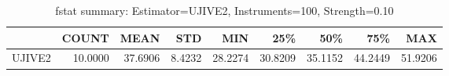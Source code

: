 \begin{table}[ht]
\centering
\caption{fstat summary: Estimator=UJIVE2, Instruments=100, Strength=0.10}
\begin{tabular}{lrrrrrrrr}
\toprule
 & COUNT & MEAN & STD & MIN & 25\% & 50\% & 75\% & MAX \\
\midrule
UJIVE2 & 10.0000 & 37.6906 & 8.4232 & 28.2274 & 30.8209 & 35.1152 & 44.2449 & 51.9206 \\
\bottomrule
\end{tabular}
\end{table}
